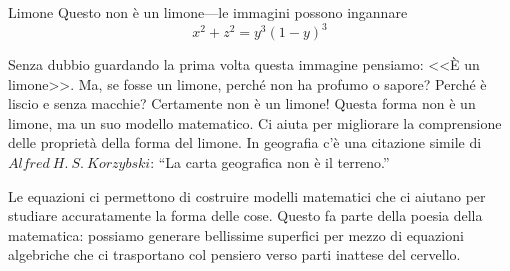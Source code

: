 \begin{surferPage}{Limone}
Questo non \`e un limone---le immagini possono ingannare\\
\smallskip
\[x^2 + z^2 = y^3 (1 - y)^3\] 


\singlespacing
Senza dubbio guardando la prima volta questa immagine pensiamo: <<\`E un limone>>. Ma, se fosse un limone, perch\'e non ha profumo o sapore? Perch\'e \`e liscio e senza macchie? Certamente non \`e un limone!
\singlespacing
Questa forma non \`e un limone, ma un suo modello matematico. Ci aiuta per migliorare la comprensione delle propriet\`a della forma del limone. In geografia c'\`e una citazione simile di $Alfred\ H.\ S.\ Korzybski$: ``La carta geografica non \`e il terreno.'' \\
\singlespacing

Le equazioni ci permettono di costruire modelli matematici che ci aiutano per studiare accuratamente la forma delle cose.
\singlespacing
Questo fa parte della poesia della matematica: possiamo generare bellissime superfici per mezzo di equazioni algebriche che ci trasportano col pensiero verso parti inattese del cervello.
\end{surferPage}
